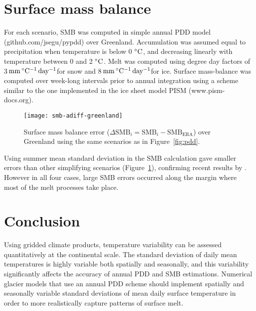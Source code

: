 \documentclass[review]{igs}
\newcommand{\degC}{\,\ensuremath{\rm^\circ C}}
\newcommand{\ddfunit}{\,\ensuremath{\rm mm\,^\circ C^{-1}\,day^{-1}}}
\begin{document}

\section{Surface mass balance}

For each scenario, SMB was computed in simple annual PDD model (github.com/jsegu/pypdd) over Greenland. Accumulation was assumed equal to precipitation when temperature is below 0\,\degC, and decreasing linearly with temperature between 0 and 2\,\degC. Melt was computed using degree day factors of 3\ddfunit for snow and 8\ddfunit for ice. Surface mass-balance was computed over week-long intervals prior to annual integration using a scheme similar to the one implemented in the ice sheet model PISM (www.pism-docs.org).  

\begin{figure}
  \centering\texttt{[image: smb-adiff-greenland]}
  \caption{Surface mass balance error ($\Delta\mathrm{SMB}_i = \mathrm{SMB}_i - \mathrm{SMB_{ERA}}$) over Greenland using the same scenarios as in Figure~\ref{fig:pdd}.}
  \label{fig:smb}
\end{figure}

Using summer mean standard deviation in the SMB calculation gave smaller errors than other simplifying scenarios (Figure~\ref{fig:smb}), confirming recent results by \citet{rau-rogozhina-2013}. However in all four cases, large SMB errors occurred along the margin where most of the melt processes take place.


\section{Conclusion}

Using gridded climate products, temperature variability can be assessed quantitatively at the continental scale. The standard deviation of daily mean temperatures is highly variable both spatially and seasonally, and this variability significantly affects the accuracy of annual PDD and SMB estimations. Numerical glacier models that use an annual PDD scheme should implement spatially and seasonally variable standard deviations of mean daily surface temperature in order to more realistically capture patterns of surface melt.

\end{document}

